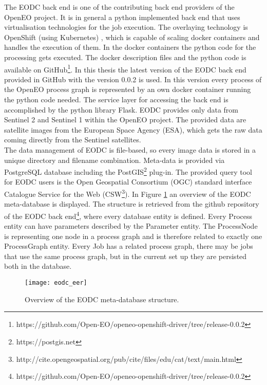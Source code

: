 \documentclass[draft,final]{vutinfth} %
\begin{document}
The EODC back end is one of the contributing back end providers of the OpenEO project. It is in general a python implemented back end that uses virtualisation technologies for the job execution. The overlaying technology is OpenShift (using Kubernetes) \cite{openshift}, which is capable of scaling docker containers and handles the execution of them. In the docker containers the python code for the processing gets executed. The docker description files and the python code is available on GitHub\footnote{https://github.com/Open-EO/openeo-openshift-driver/tree/release-0.0.2}. In this thesis the latest version of the EODC back end provided in GitHub with the version 0.0.2 is used. In this version every process of the OpenEO process graph is represented by an own docker container running the python code needed. The service layer for accessing the back end is accomplished by the python library Flask. EODC provides only data from Sentinel 2 and Sentinel 1 within the OpenEO project. The provided data are satellite images from the European Space Agency (ESA), which gets the raw data coming directly from the Sentinel satellites. \\
The data management of EODC is file-based, so every image data is stored in a unique directory and filename combination. Meta-data is provided via PostgreSQL database including the PostGIS\footnote{https://postgis.net} plug-in. The provided query tool for EODC users is the Open Geospatial Consortium (OGC) standard interface Catalogue Service for the Web (CSW\footnote{http://cite.opengeospatial.org/pub/cite/files/edu/cat/text/main.html}). In Figure \ref{fig:eodceer} an overview of the EODC meta-database is displayed. The structure is retrieved from the github repository of the EODC back end\footnote{https://github.com/Open-EO/openeo-openshift-driver/tree/release-0.0.2}, where every database entity is defined. Every Process entity can have parameters described by the Parameter entity. The ProcessNode is representing one node in a process graph and is therefore related to exactly one ProcessGraph entity. Every Job has a related process graph, there may be jobs that use the same process graph, but in the current set up they are persisted both in the database.

\begin{figure}[h]
	\centering
	\texttt{[image: eodc\_eer]}
	\caption{Overview of the EODC meta-database structure.}
	\label{fig:eodceer} %
\end{figure}
\end{document}
